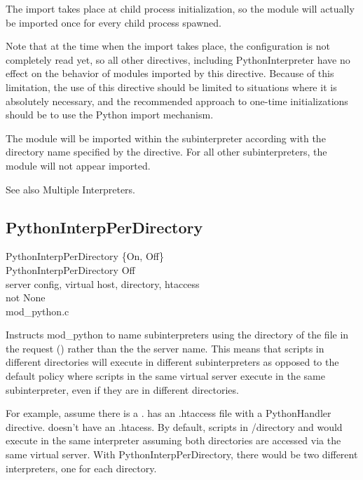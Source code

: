 The import takes place at child process initialization, so the module
will actually be imported once for every child process spawned.

Note that at the time when the import takes place, the configuration
is not completely read yet, so all other directives, including
PythonInterpreter have no effect on the behavior of modules imported
by this directive. Because of this limitation, the use of this
directive should be limited to situations where it is absolutely
necessary, and the recommended approach to one-time initializations
should be to use the Python import mechanism.

The module will be imported within the subinterpreter according with
the directory name specified by the  directive. For
all other subinterpreters, the module will not appear imported.

See also Multiple Interpreters. 

\subsection{PythonInterpPerDirectory\label{dir-other-ipd}}

PythonInterpPerDirectory \{On, Off\} \\
PythonInterpPerDirectory Off\\
server config, virtual host, directory, htaccess\\
not None\\
mod_python.c

Instructs mod_python to name subinterpreters using the directory of
the file in the request () rather than the the
server name. This means that scripts in different directories will
execute in different subinterpreters as opposed to the default policy
where scripts in the same virtual server execute in the same
subinterpreter, even if they are in different directories.

For example, assume there is a
.  has an .htaccess
file with a PythonHandler directive.  
doesn't have an .htacess. By default, scripts in /directory and
 would execute in the same interpreter assuming
both directories are accessed via the same virtual server. With
PythonInterpPerDirectory, there would be two different interpreters,
one for each directory.

